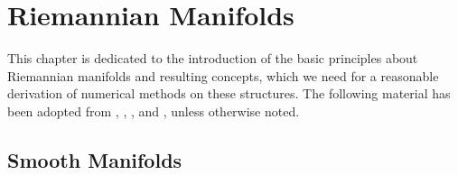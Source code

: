 \chapter{Riemannian Manifolds}
\label{Chapter3}

This chapter is dedicated to the introduction of the basic principles about Riemannian manifolds and resulting concepts, which we need for a reasonable derivation of numerical methods on these structures. The following material has been adopted from \cite{AbsilMahonySepulchre:2008}, \cite{Huang:2013}, \cite{Lee:1997}, \cite{Lee:2003} and \cite{Lee:2019}, unless otherwise noted. \\

\section{Smooth Manifolds}

